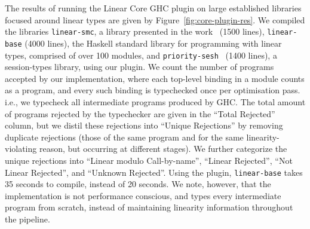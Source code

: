 \documentclass[acmsmall,review]{acmart}
\begin{document}
The results of running the Linear Core GHC plugin on large established
libraries focused around linear types are given by
Figure~\ref{fig:core-plugin-res}.
%
We compiled the libraries \texttt{linear-smc}, a library presented in the
work~\cite{10.1145/3471874.3472980} (1500 lines), \texttt{linear-base} (4000
lines), the Haskell standard library for programming with linear types,
comprised of over 100 modules, and
\texttt{priority-sesh}~\cite{10.1145/3471874.3472979} (1400 lines), a
session-types library, using our plugin.
%
We count the number of programs accepted by our implementation, where each
top-level binding in a module counts as a program, and every such binding is
typechecked once per optimisation pass. i.e., we typecheck all intermediate
programs produced by GHC. The total amount of programs rejected by the
typechecker are given in the ``Total Rejected'' column, but we distil these
rejections into ``Unique Rejections'' by removing duplicate rejections (those
of the same program and for the same linearity-violating reason, but occurring
at different stages). We further categorize the unique rejections into ``Linear
modulo Call-by-name'', ``Linear Rejected'', ``Not Linear Rejected'', and
``Unknown Rejected''.
%
Using the plugin, \texttt{linear-base} takes 35 seconds to compile, instead of
20 seconds. We note, however, that the implementation is not performance
conscious, and types every intermediate program from scratch, instead of
maintaining linearity information throughout the pipeline.
\end{document}
